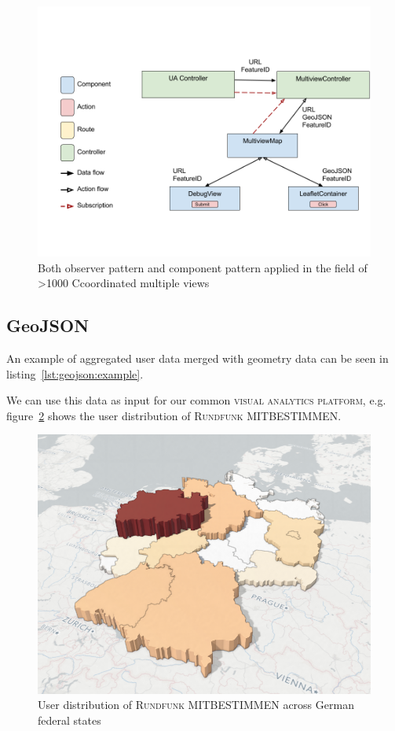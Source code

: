 \documentclass{article}
\newcommand{\rufu}{\textsc{Rundfunk MITBESTIMMEN}}
\newcommand{\visan}{\textsc{visual analytics platform}}
\newcommand\hmm[1]{\ifnum\ifhmode\spacefactor\else2000\fi>1000 \uppercase{#1}\else#1\fi}
\newcommand{\cmvs}{\hmm{c}oordinated multiple views}
\begin{document}
\begin{figure}[h!]
  \centering
  \includegraphics[width=\textwidth]{images/both-patterns-implemented.png}
  \caption{Both observer pattern and component pattern applied in the field of \cmvs{}}
  \label{fig:implementation:both-patterns}
\end{figure}


\subsection{GeoJSON}

An example of aggregated user data merged with geometry data can be seen in listing~\ref{lst:geojson:example}.


We can use this data as input for our common \visan{}, e.g. figure~\ref{fig:implementation:user_distribution} shows the user distribution of \rufu{}.

\begin{figure}[h!]
  \centering
  \includegraphics[width=\textwidth]{images/ua_example.png}
  \caption{User distribution of \rufu{} across German federal states}
  \label{fig:implementation:user_distribution}
\end{figure}
\end{document}
